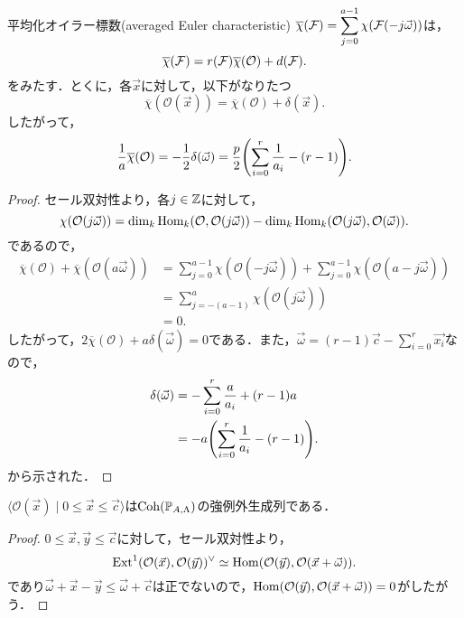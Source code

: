\begin{thm}
	平均化オイラー標数(averaged Euler characteristic) $\displaystyle\overline{\chi}({\mathcal F}) = \sum_{j=0}^{a-1}\chi({\mathcal F}(-j\vec{\omega}))$は，
\[\overline{\chi}({\mathcal F}) = r({\mathcal F})\overline{\chi}(\mathcal{O}) + d({\mathcal F}).\]
をみたす．とくに，各$\vec{x}$に対して，以下がなりたつ
\[\overline{\chi}(\mathcal{O}(\vec{x})) = \overline{\chi}(\mathcal{O}) + \delta(\vec{x}).\]
したがって，
\[\frac{1}{a}\overline{\chi}(\mathcal{O}) = -\frac{1}{2}\delta(\vec{\omega}) = \frac{p}{2}\qty(\sum_{i=0}^r\frac{1}{a_i} - (r-1)) .\]
\end{thm}
\begin{proof}
	セール双対性より，各$j\in{\mathbb Z}$に対して，
\[\chi(\mathcal{O}(j\vec{\omega})) = \dim_k\operatorname{\mathrm{Hom}}_{k}(\mathcal{O},\mathcal{O}(j\vec{\omega})) - \dim_k\operatorname{\mathrm{Hom}}_{k}(\mathcal{O}(j\vec{\omega}),\mathcal{O}(\vec{\omega})).\]
であるので，
\begin{align*}
	\overline{\chi}(\mathcal{O}) + \overline{\chi}(\mathcal{O}(a\vec{\omega})) &= \sum_{j=0}^{a-1}\chi(\mathcal{O}(-j\vec{\omega})) +\sum_{j=0}^{a-1}\chi(\mathcal{O}(a-j\vec{\omega}))\\
																																						 &= \sum_{j=-(a-1)}^{a}\chi(\mathcal{O}(j\vec{\omega}))\\
																																						 &= 0.
\end{align*}
したがって，$2\overline{\chi}(\mathcal{O}) + a\delta(\vec{\omega}) = 0$である．また，$\vec{\omega} = (r-1)\vec{c} - \sum_{i=0}^r\vec{x_i}$なので，
\begin{align*}
	\delta(\vec{\omega}) &= -\sum_{i=0}^r\frac{a}{a_i} +(r-1)a\\
											 &= -a\qty(\sum_{i=0}^r\frac{1}{a_i} - (r-1)).
\end{align*}
 から示された．
\end{proof}

\begin{lemm}\label{lemm:exceptional object}
	$\langle\mathcal{O}(\vec{x}) \mid 0\le \vec{x}\le \vec{c}\rangle$は$\operatorname{\mathrm{Coh}}({\mathbb P}_{A,\Lambda})$の強例外生成列である．
\end{lemm}
\begin{proof}
	$0\le \vec{x},\vec{y}\le \vec{c}$に対して，セール双対性より，
	\[\operatorname{\mathrm{Ext}}^1(\mathcal{O}(\vec{x}),\mathcal{O}(\vec{y}))^\vee \simeq \operatorname{\mathrm{Hom}}(\mathcal{O}(\vec{y}),\mathcal{O}(\vec{x}+\vec{\omega})).\]
	であり$\vec{\omega} +\vec{x} - \vec{y}\le\vec{\omega} + \vec{c}$は正でないので，$\operatorname{\mathrm{Hom}}(\mathcal{O}(\vec{y}),\mathcal{O}(\vec{x}+\vec{\omega})) = 0$がしたがう．
\end{proof}

